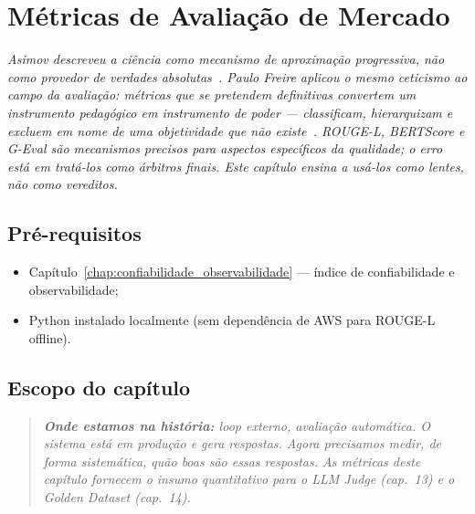 \chapter{M\'etricas de Avalia\c{c}\~ao de Mercado}
\label{chap:avaliacao_metricas_mercado}

{\small\itshape\color{AccentGray}
Asimov descreveu a ci\^{e}ncia como mecanismo de aproxima\c{c}\~{a}o progressiva, n\~{a}o como provedor de verdades absolutas~\cite{asimov1988worldofideas}. Paulo Freire aplicou o mesmo ceticismo ao campo da avalia\c{c}\~{a}o: m\'{e}tricas que se pretendem definitivas convertem um instrumento pedag\'{o}gico em instrumento de poder --- classificam, hierarquizam e excluem em nome de uma objetividade que n\~{a}o existe~\cite{freire1996autonomia}. ROUGE-L, BERTScore e G-Eval s\~{a}o mecanismos precisos para aspectos espec\'{i}ficos da qualidade; o erro est\'{a} em trat\'{a}-los como \'{a}rbitros finais. Este cap\'{i}tulo ensina a us\'{a}-los como lentes, n\~{a}o como vereditos.\par}
\vspace{0.6em}
\section{Pr\'e-requisitos}

\begin{itemize}[leftmargin=*]
  \item Cap\'itulo~\ref{chap:confiabilidade_observabilidade} ---
        \'indice de confiabilidade e observabilidade;
  \item Python instalado localmente (sem depend\^encia de AWS para
        ROUGE-L offline).
\end{itemize}

\section{Escopo do cap\'itulo}

\begin{quote}\itshape
\textbf{Onde estamos na hist\'oria:} loop externo, avalia\c{c}\~ao
autom\'atica. O sistema est\'a em produ\c{c}\~ao e gera respostas.
Agora precisamos medir, de forma sistem\'atica, qu\~ao boas s\~ao
essas respostas. As m\'etricas deste cap\'itulo fornecem o insumo
quantitativo para o LLM Judge (cap.~13) e o Golden Dataset (cap.~14).
\end{quote}

